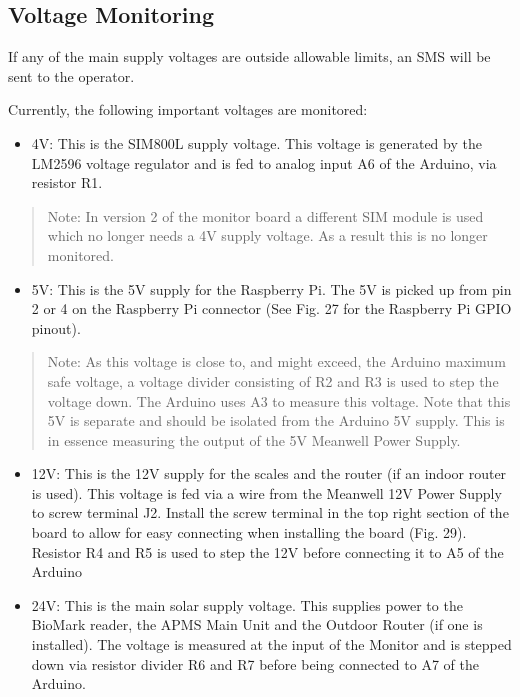 \documentclass[
  letterpaper,
]{scrbook}
\providecommand{\tightlist}{%
  \setlength{\itemsep}{0pt}\setlength{\parskip}{0pt}}
\begin{document}
\subsection{Voltage Monitoring}\label{voltage-monitoring}

If any of the main supply voltages are outside allowable limits, an SMS
will be sent to the operator.

Currently, the following important voltages are monitored:

\begin{itemize}
\tightlist
\item
  4V: This is the SIM800L supply voltage. This voltage is generated by
  the LM2596 voltage regulator and is fed to analog input A6 of the
  Arduino, via resistor R1.
\end{itemize}

\begin{quote}
Note: In version 2 of the monitor board a different SIM module is used
which no longer needs a 4V supply voltage. As a result this is no longer
monitored.
\end{quote}

\begin{itemize}
\tightlist
\item
  5V: This is the 5V supply for the Raspberry Pi. The 5V is picked up
  from pin 2 or 4 on the Raspberry Pi connector (See Fig. 27 for the
  Raspberry Pi GPIO pinout).
\end{itemize}

\begin{quote}
Note: As this voltage is close to, and might exceed, the Arduino maximum
safe voltage, a voltage divider consisting of R2 and R3 is used to step
the voltage down. The Arduino uses A3 to measure this voltage. Note that
this 5V is separate and should be isolated from the Arduino 5V supply.
This is in essence measuring the output of the 5V Meanwell Power Supply.
\end{quote}

\begin{itemize}
\item
  12V: This is the 12V supply for the scales and the router (if an
  indoor router is used). This voltage is fed via a wire from the
  Meanwell 12V Power Supply to screw terminal J2. Install the screw
  terminal in the top right section of the board to allow for easy
  connecting when installing the board (Fig. 29). Resistor R4 and R5 is
  used to step the 12V before connecting it to A5 of the Arduino
\item
  24V: This is the main solar supply voltage. This supplies power to the
  BioMark reader, the APMS Main Unit and the Outdoor Router (if one is
  installed). The voltage is measured at the input of the Monitor and is
  stepped down via resistor divider R6 and R7 before being connected to
  A7 of the Arduino.
\end{itemize}
\end{document}
